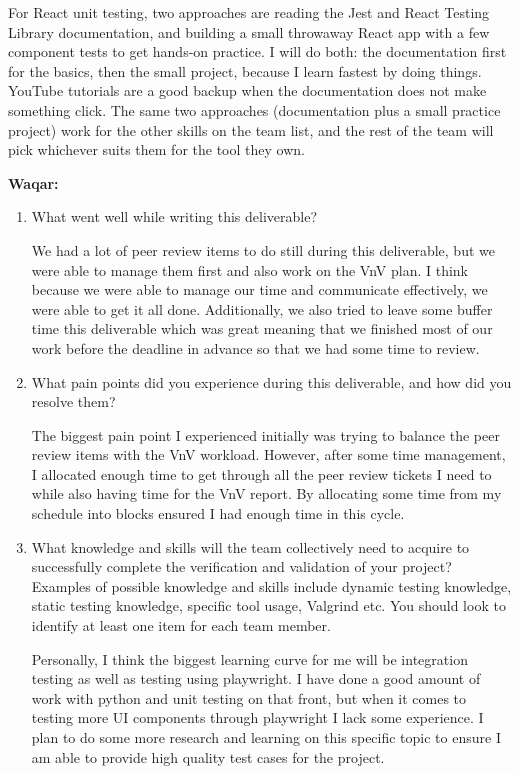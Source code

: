 \documentclass[12pt, titlepage]{article}
\begin{document}
\begin{enumerate}
  For React unit testing, two approaches are reading the Jest and React Testing Library
  documentation, and building a small throwaway React app with a few component tests to
  get hands-on practice. I will do both: the documentation first for the basics, then the
  small project, because I learn fastest by doing things. YouTube tutorials are a good
  backup when the documentation does not make something click. The same two approaches
  (documentation plus a small practice project) work for the other skills on the team
  list, and the rest of the team will pick whichever suits them for the tool they own.

\end{enumerate}
\textbf{Waqar:}
\begin{enumerate}
  \item What went well while writing this deliverable?

  We had a lot of peer review items to do still during this deliverable, but we were able 
  to manage them first and also work on the VnV plan. I think because we were able to manage 
  our time and communicate effectively, we were able to get it all done. Additionally, we 
  also tried to leave some buffer time this deliverable which was great meaning that we 
  finished most of our work before the deadline in advance so that we had some time to review.

  \item What pain points did you experience during this deliverable, and how
      did you resolve them?

  The biggest pain point I experienced initially was trying to balance the peer review items 
  with the VnV workload. However, after some time management, I allocated enough time to get 
  through all the peer review tickets I need to while also having time for the VnV report. By 
  allocating some time from my schedule into blocks ensured I had enough time in this cycle.

  \item What knowledge and skills will the team collectively need to acquire to
  successfully complete the verification and validation of your project?
  Examples of possible knowledge and skills include dynamic testing knowledge,
  static testing knowledge, specific tool usage, Valgrind etc.  You should look to
  identify at least one item for each team member.

  Personally, I think the biggest learning curve for me will be integration testing as 
  well as testing using playwright. I have done a good amount of work with python and 
  unit testing on that front, but when it comes to testing more UI components through 
  playwright I lack some experience. I plan to do some more research and learning on this 
  specific topic to ensure I am able to provide high quality test cases for the project.



\end{enumerate}
\end{document}
